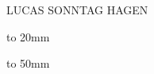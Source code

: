 \setcounter{page}{1}
\thispagestyle{empty}
{}
\begin{center}
\end{center}

\vfill

\begin{center}
LUCAS SONNTAG HAGEN
\end{center}

\vfill

\noindent\parbox[t]{\textwidth}{%
\centering%
\vbox to 20mm{%
\parbox[b]{90mm}{%
\centering\vbox to 50mm{%
        {\large\textbf{\@\newtitle}\par}
        \vfill
}}%
}}

\vfill

\vfill

\begin{center}
\end{center}

